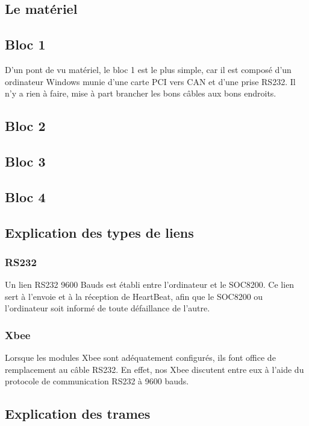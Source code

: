 \documentclass[10pt,a4paper,final]{article}
\begin{document}
\begin{spacing}{1.5}
\pagebreak

\section{Le matériel}
\subsection{Bloc 1}
D'un pont de vu matériel, le bloc 1 est le plus simple, car il est composé d'un ordinateur Windows munie d'une carte PCI vers CAN et d'une prise RS232. Il n'y a rien à faire, mise à part brancher les bons câbles aux bons endroits.

\subsection{Bloc 2}

\subsection{Bloc 3}

\subsection{Bloc 4}



\subsection{Explication des types de liens}
\subsubsection{RS232}
Un lien RS232 9600 Bauds est établi entre l'ordinateur et le SOC8200. Ce lien sert à l'envoie et à la réception de HeartBeat, afin que le SOC8200 ou l'ordinateur soit informé de toute défaillance de l'autre.

\subsubsection{Xbee}
Lorsque les modules Xbee sont adéquatement configurés, ils font office de remplacement au câble RS232. En effet, nos Xbee discutent entre eux à l'aide du protocole de communication RS232 à 9600 bauds.  


\subsection{Explication des trames}

\end{spacing}
\end{document}
